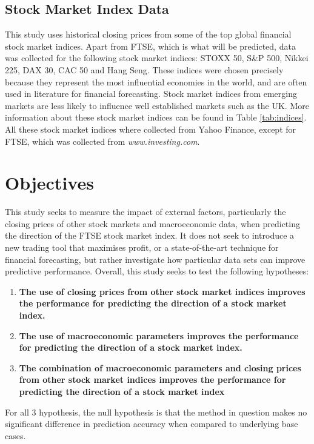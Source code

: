 \documentclass{UoYCSproject}
\begin{document}
\subsection{Stock Market Index Data}
This study uses historical closing prices from some of the top global financial stock market indices. Apart from FTSE, which is what will be predicted, data was collected for the following stock market indices: STOXX 50, S\&P 500, Nikkei 225, DAX 30, CAC 50 and Hang Seng. These indices were chosen precisely because they represent the most influential economies in the world, and are often used in literature for financial forecasting. Stock market indices from emerging markets are less likely to influence well established markets such as the UK.  More information about these stock market indices can be found in Table \ref{tab:indices}. All these stock market indices where collected from Yahoo Finance, except for FTSE, which was collected from \textit{www.investing.com}. 

\section{Objectives}
\label{sec:objectives}
This study seeks to measure the impact of external factors, particularly the closing prices of other stock markets and macroeconomic data, when predicting the direction of the FTSE stock market index. It does not seek to introduce a new trading tool that maximises profit, or a state-of-the-art technique for financial forecasting, but rather investigate how particular data sets can improve predictive performance. Overall, this study seeks to test the following hypotheses:

\begin{enumerate}
    \item \label{h1} \textbf{The use of closing prices from other stock market indices improves the performance for predicting the direction of a stock market index.}
    \item \label{h2} \textbf{The use of macroeconomic parameters improves the performance for predicting the direction of a stock market index.}
    \item \label{h3} \textbf{The combination of macroeconomic parameters and closing prices from other stock market indices improves the performance for predicting  the direction of a stock market index}
\end{enumerate}

For all 3 hypothesis, the null hypothesis is that the method in question makes no significant difference in prediction accuracy when compared to underlying base cases.
\end{document}
